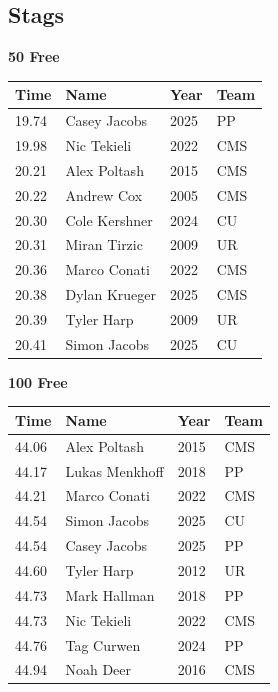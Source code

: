 \subsection{Stags}
\vspace{1.2em}
\noindent\begin{minipage}[t]{0.98\textwidth}
\centering
\textbf{\textcolor{teamprimary}{50 Free}}\par
\vspace{0.5em}
\centering
\small
\renewcommand{\arraystretch}{1.0}
\setlength{\tabcolsep}{4pt}
\begin{tabular}{@{}p{2.5cm}p{4.5cm}p{1.5cm}p{2.5cm}@{}}
\toprule
\textbf{Time} & \textbf{Name} & \textbf{Year} & \textbf{Team} \\
\midrule
19.74 & Casey Jacobs & 2025 & PP \\
19.98 & Nic Tekieli & 2022 & CMS \\
20.21 & Alex Poltash & 2015 & CMS \\
20.22 & Andrew Cox & 2005 & CMS \\
20.30 & Cole Kershner & 2024 & CU \\
20.31 & Miran Tirzic & 2009 & UR \\
20.36 & Marco Conati & 2022 & CMS \\
20.38 & Dylan Krueger & 2025 & CMS \\
20.39 & Tyler Harp & 2009 & UR \\
20.41 & Simon Jacobs & 2025 & CU \\
\bottomrule
\end{tabular}
\end{minipage}
\vspace{1.2em}
\noindent\begin{minipage}[t]{0.98\textwidth}
\centering
\textbf{\textcolor{teamprimary}{100 Free}}\par
\vspace{0.5em}
\centering
\small
\renewcommand{\arraystretch}{1.0}
\setlength{\tabcolsep}{4pt}
\begin{tabular}{@{}p{2.5cm}p{4.5cm}p{1.5cm}p{2.5cm}@{}}
\toprule
\textbf{Time} & \textbf{Name} & \textbf{Year} & \textbf{Team} \\
\midrule
44.06 & Alex Poltash & 2015 & CMS \\
44.17 & Lukas Menkhoff & 2018 & PP \\
44.21 & Marco Conati & 2022 & CMS \\
44.54 & Simon Jacobs & 2025 & CU \\
44.54 & Casey Jacobs & 2025 & PP \\
44.60 & Tyler Harp & 2012 & UR \\
44.73 & Mark Hallman & 2018 & PP \\
44.73 & Nic Tekieli & 2022 & CMS \\
44.76 & Tag Curwen & 2024 & PP \\
44.94 & Noah Deer & 2016 & CMS \\
\bottomrule
\end{tabular}
\end{minipage}
